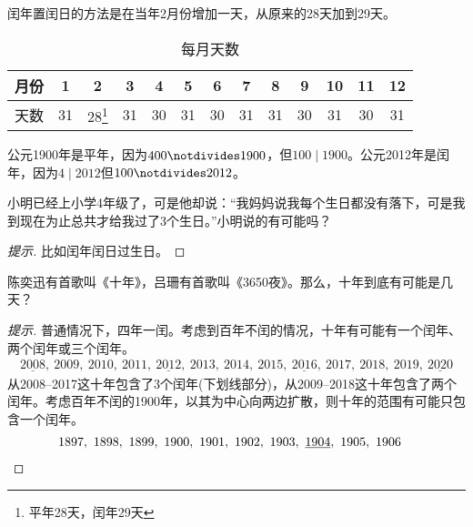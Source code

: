 闰年置闰日的方法是在当年2月份增加一天，从原来的28天加到29天。

\begin{table}[htbp]
  \centering
  \caption{每月天数}
  \label{tab:days-of-months}
  \begin{minipage}{\textwidth}  %
  \centering
  \begin{tabular}{ccccccccccccc}
    \toprule
    月份 & 1  & 2          & 3  & 4  & 5  & 6  & 7  & 8  & 9  & 10 & 11 & 12\\\midrule
    天数 & 31 & 28\footnote{平年28天，闰年29天} & 31 & 30 & 31 & 30 & 31 & 31 & 30 & 31 & 30 & 31\\
    \bottomrule
  \end{tabular}
  \end{minipage}
\end{table}

\begin{example}
  公元1900年是平年，因为$400\notdivides 1900$，但$100\mid 1900$。公元2012年是闰年，因为$4\mid 2012$但$100\notdivides 2012$。
\end{example}

\begin{example}
  小明已经上小学4年级了，可是他却说：“我妈妈说我每个生日都没有落下，可是我到现在为止总共才给我过了3个生日。”小明说的有可能吗？
\end{example}
\begin{proof}[提示]
  比如闰年闰日过生日。
\end{proof}

\begin{example}[10年3650天]
  陈奕迅有首歌叫《十年》，吕珊有首歌叫《3650夜》。那么，十年到底有可能是几天？
\end{example}
\begin{proof}[提示]
  普通情况下，四年一闰。考虑到百年不闰的情况，十年有可能有一个闰年、两个闰年或三个闰年。
  {\small
  \begin{align*}
    \underline{2008},\ 2009,\ 2010,\ 2011,\ \underline{2012},\ 2013,\ 2014,\ 2015,\ \underline{2016},\ 2017,\ 2018,\ 2019,\ \underline{2020}
  \end{align*}
  }
  从2008--2017这十年包含了3个闰年(下划线部分)，从2009--2018这十年包含了两个闰年。考虑百年不闰的1900年，以其为中心向两边扩散，则十年的范围有可能只包含一个闰年。
  {
  \begin{align*}
    1897,\ 1898,\ 1899,\ 1900,\ 1901,\ 1902,\ 1903,\ \underline{1904},\ 1905,\ 1906&\qedhere
  \end{align*}
  }
\end{proof}

